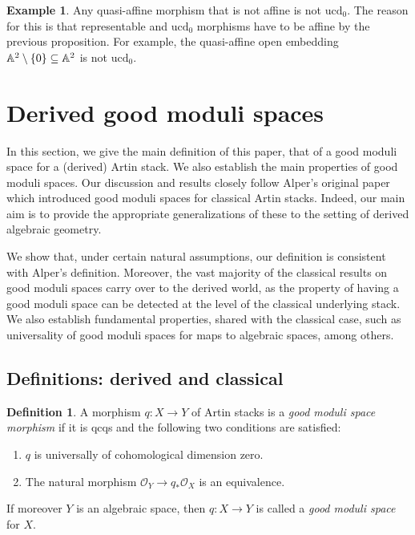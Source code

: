 \documentclass[a4paper,twoside,11pt]{amsart}
\theoremstyle{plain}
\theoremstyle{definition}
\newtheorem{definition}[theorem]{Definition}
\newtheorem{example}[theorem]{Example}
\theoremstyle{remark}
\numberwithin{equation}{section}
\newcommand{\ucd}{$\mathrm{ucd}_{0}$\xspace}
\newcommand{\oO}{\mathcal{O}}
\begin{document}
\begin{example}
    Any quasi-affine morphism that is not affine is not \ucd. The reason for this is that representable and \ucd morphisms have to be affine by the previous proposition. For example, the quasi-affine open embedding $\AA^2 \setminus \lbrace 0 \rbrace \subseteq \AA^2$ is not \ucd.
\end{example}


\section{Derived good moduli spaces} \label{sec:3}

In this section, we give the main definition of this paper, that of a good moduli space for a (derived) Artin stack. We also establish the main properties of good moduli spaces. Our discussion and results closely follow Alper's original paper \cite{AlperGood} which introduced good moduli spaces for classical Artin stacks. Indeed, our main aim is to provide the appropriate generalizations of these to the setting of derived algebraic geometry. 

We show that, under certain natural assumptions, our definition is consistent with Alper's definition. Moreover, the vast majority of the classical results on good moduli spaces carry over to the derived world, as the property of having a good moduli space can be detected at the level of the classical underlying stack. We also establish fundamental properties, shared with the classical case, such as universality of good moduli spaces for maps to algebraic spaces, among others.

\subsection{Definitions: derived and classical}

\begin{definition} \label{def:gms}
A morphism $q \colon X \to Y$ of Artin stacks is a \emph{good moduli space morphism} if it is qcqs and the following two conditions are satisfied:
\begin{enumerate}
    \item[(i)] $q$ is universally of cohomological dimension zero.
    \item[(ii)] The natural morphism $\oO_Y \to q_\ast \oO_X$ is an equivalence.
\end{enumerate}
If moreover $Y$ is an algebraic space, then $q \colon X \to Y$ is called a \emph{good moduli space} for $X$.
\end{definition}
\end{document}
